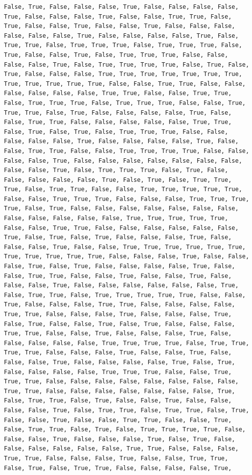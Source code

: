 \documentclass[
  letterpaper,
  DIV=11,
  numbers=noendperiod]{scrartcl}
\begin{document}
\begin{verbatim}
False, True, False, False, False, True, False, False, False, False, True, False, False, False, True, False, False, True, True, False, True, False, False, True, False, False, True, False, False, False, False, False, False, True, False, False, False, False, True, False, True, True, False, True, True, True, False, True, True, True, False, True, False, False, True, False, True, True, True, False, False, False, False, True, False, True, True, True, True, False, True, False, True, False, False, False, True, True, True, True, True, True, True, True, True, True, True, True, False, False, True, True, False, False, False, False, False, False, True, True, False, False, True, True, False, True, True, True, False, True, True, True, False, False, True, True, True, False, True, False, False, False, False, True, False, False, True, True, False, False, False, False, False, True, True, False, True, False, True, False, True, True, True, False, False, False, False, False, True, False, False, False, False, True, False, False, True, True, False, False, True, True, True, True, False, False, False, False, True, False, False, False, False, False, False, False, False, False, True, False, True, True, True, False, True, False, False, False, False, False, True, False, True, False, True, True, True, False, True, True, False, False, True, True, True, True, True, False, False, True, True, True, False, False, False, True, True, True, True, False, True, False, False, False, False, False, False, False, False, False, False, False, False, True, True, True, True, True, False, False, True, True, False, False, False, False, False, False, True, False, True, False, True, False, False, False, True, False, False, False, True, False, False, True, True, True, True, True, True, True, True, True, True, True, False, False, False, True, False, False, False, True, False, True, False, False, False, False, True, False, False, True, True, False, False, True, False, False, True, False, False, False, True, False, False, False, False, False, False, True, False, True, True, False, True, True, True, True, True, False, False, True, False, False, False, True, True, False, False, False, False, True, True, False, False, False, True, False, False, False, True, False, True, False, False, True, False, True, False, False, False, True, True, False, False, True, False, False, False, True, False, False, False, False, False, True, True, True, True, False, True, True, True, True, False, False, False, True, False, False, True, False, False, False, True, False, False, False, False, True, False, True, False, False, False, False, True, True, True, False, False, True, True, True, False, False, False, False, False, False, False, False, True, True, False, False, False, False, False, False, False, True, False, True, True, False, True, False, False, True, False, False, False, False, True, False, True, True, False, True, True, False, True, False, False, True, False, False, True, True, False, False, True, False, True, True, False, True, False, True, True, True, True, False, False, False, True, False, False, False, True, False, True, False, False, False, False, False, False, True, True, False, False, False, True, True, False, False, False, True, False, False, True, True, False, True, False, True, True, False, False, False, False, True, 
\end{verbatim}
\end{document}

